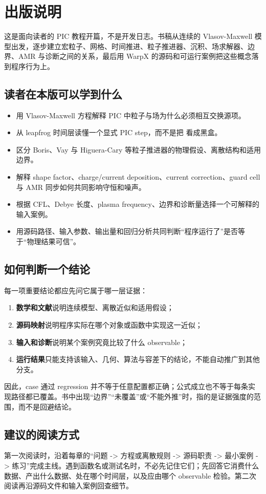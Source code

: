 
\chapter*{出版说明}

这是面向读者的 PIC 教程开篇，不是开发日志。书稿从连续的 Vlasov-Maxwell 模型出发，逐步建立宏粒子、网格、时间推进、粒子推进器、沉积、场求解器、边界、AMR 与诊断之间的关系，最后用 WarpX 的源码和可运行案例把这些概念落到程序行为上。

\section*{读者在本版可以学到什么}

\begin{itemize}
  \item 用 Vlasov-Maxwell 方程解释 PIC 中粒子与场为什么必须相互交换源项。
  \item 从 leapfrog 时间层读懂一个显式 PIC step，而不是把  看成黑盒。
  \item 区分 Boris、Vay 与 Higuera-Cary 等粒子推进器的物理假设、离散结构和适用边界。
  \item 解释 shape factor、charge/current deposition、current correction、guard cell 与 AMR 同步如何共同影响守恒和噪声。
  \item 根据 CFL、Debye 长度、plasma frequency、边界和诊断量选择一个可解释的输入案例。
  \item 用源码路径、输入参数、输出量和回归分析共同判断“程序运行了”是否等于“物理结果可信”。
\end{itemize}

\section*{如何判断一个结论}

每一项重要结论都应先问它属于哪一层证据：

\begin{enumerate}
  \item \textbf{数学和文献}说明连续模型、离散近似和适用假设；
  \item \textbf{源码映射}说明程序实际在哪个对象或函数中实现这一近似；
  \item \textbf{输入和诊断}说明某个案例究竟比较了什么 observable；
  \item \textbf{运行结果}只能支持该输入、几何、算法与容差下的结论，不能自动推广到其他分支。
\end{enumerate}

因此，case 通过 regression 并不等于任意配置都正确；公式成立也不等于每条实现路径都已覆盖。书中出现“边界”“未覆盖”或“不能外推”时，指的是证据强度的范围，而不是回避结论。

\section*{建议的阅读方式}

第一次阅读时，沿着每章的“问题 -> 方程或离散规则 -> 源码职责 -> 最小案例 -> 练习”完成主线。遇到函数名或测试名时，不必先记住它们；先回答它消费什么数据、产出什么数据、处在哪个时间层，以及应由哪个 observable 检验。第二次阅读再沿源码文件和输入案例回查细节。
